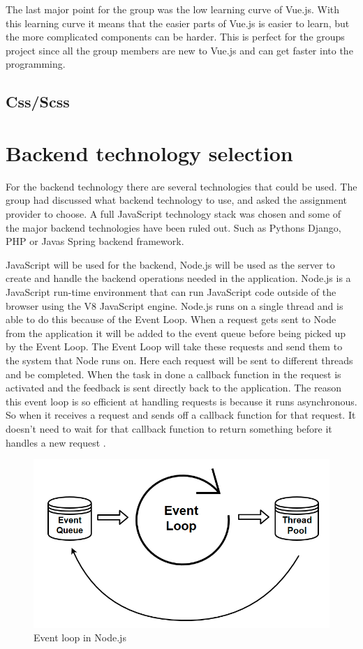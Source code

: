 The last major point for the group was the low learning curve of Vue.js. With this learning curve it means that the easier parts of Vue.js is easier to learn, but the more complicated components can be harder. This is perfect for the groups project since all the group members are new to Vue.js and can get faster into the programming.

\subsection{Css/Scss}

\section{Backend technology selection}
For the backend technology there are several technologies that could be used. The group had discussed what backend technology to use, and asked the assignment provider to choose. A full JavaScript technology stack was chosen and some of the major backend technologies have been ruled out. Such as Pythons Django, PHP or Javas Spring backend framework. 

JavaScript will be used for the backend, Node.js will be used as the server to create and handle the backend operations needed in the application. Node.js is a JavaScript run-time environment that can run JavaScript code outside of the browser using the V8 JavaScript engine. Node.js runs on a single thread and is able to do this because of the Event Loop. When a request gets sent to Node from the application it will be added to the event queue before being picked up by the Event Loop. The Event Loop will take these requests and send them to the system that Node runs on. Here each request will be sent to different threads and be completed. When the task in done a callback function in the request is activated and the feedback is sent directly back to the application. The reason this event loop is so efficient at handling requests is because it runs asynchronous. So when it receives a request and sends off a callback function for that request. It doesn't need to wait for that callback function to return something before it handles a new request \cite{Node-event-loop}.

\begin{figure}
    \centering
    \includegraphics[width=115mm,scale=1]{figures/event_loop.png}
    \caption{Event loop in Node.js}
    \label{fig:Node_Event_Loop}
\end{figure}

